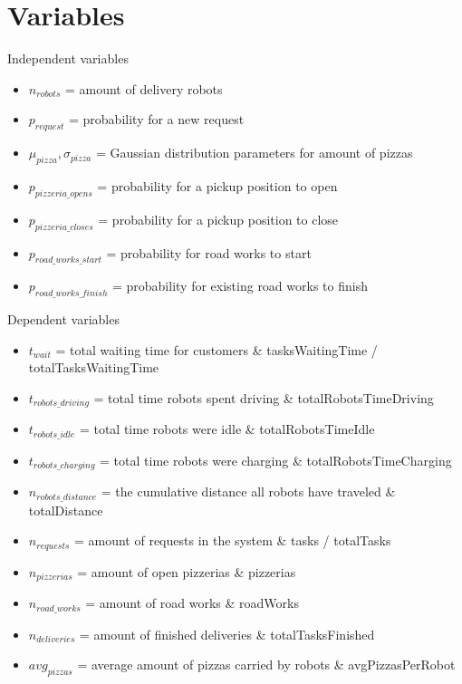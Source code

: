 \section{Variables}
\begin{frame}{Independent variables}
    \begin{itemize}
        \item $n_{robots}$ = amount of delivery robots
        \item $p_{request}$ = probability for a new request
        \item $\mu_{pizza}, \sigma_{pizza}$ = Gaussian distribution parameters for amount of pizzas
        \item $p_{pizzeria\_opens}$  = probability for a pickup position to open
        \item $p_{pizzeria\_closes}$ = probability for a pickup position to close
        \item $p_{road\_works\_start}$ = probability for road works to start
        \item $p_{road\_works\_finish}$ = probability for existing road works to finish
    \end{itemize}
\end{frame}

\begin{frame}{Dependent variables}
    \begin{itemize}
        \item $t_{wait}$ = total waiting time for customers \& tasksWaitingTime / totalTasksWaitingTime
        \item $t_{robots\_driving}$ = total time robots spent driving \& totalRobotsTimeDriving
        \item $t_{robots\_idle}$ = total time robots were idle \& totalRobotsTimeIdle
        \item $t_{robots\_charging}$ = total time robots were charging \& totalRobotsTimeCharging
        \item $n_{robots\_distance}$ = the cumulative distance all robots have traveled \& totalDistance
        \item $n_{requests}$ = amount of requests in the system \& tasks / totalTasks
        \item $n_{pizzerias}$ = amount of open pizzerias \& pizzerias
        \item $n_{road\_works}$ = amount of road works \& roadWorks
        \item $n_{deliveries}$ = amount of finished deliveries \& totalTasksFinished
        \item $avg_{pizzas}$ = average amount of pizzas carried by robots \& avgPizzasPerRobot
    \end{itemize}
\end{frame}

